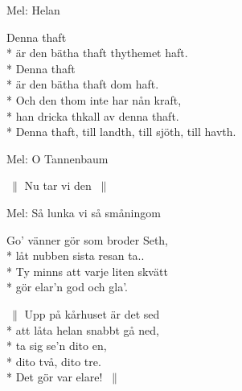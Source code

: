 \begin{SongText}
\begin{SongInfo}
    Mel: Helan
\end{SongInfo}
\begin{SongVerse}
    Denna thaft\\*%
    är den bätha thaft thythemet haft.\\*%
    Denna thaft\\*%
    är den bätha thaft dom haft.\\*%
    Och den thom inte har nån kraft,\\*%
    han dricka thkall av denna thaft.\\*%
    Denna thaft, till landth, till sjöth, till havth.
\end{SongVerse}
\end{SongText}
\begin{SongText}
\begin{SongInfo}
    Mel: O Tannenbaum
\end{SongInfo}
\begin{SongVerse}
    $\:\|$ Nu tar vi den $\:\|$
\end{SongVerse}
\end{SongText}
\begin{SongText}
\begin{SongInfo}
    Mel: Så lunka vi så småningom
\end{SongInfo}
\begin{SongVerse}
    Go’ vänner gör som broder Seth,\\*%
    låt nubben sista resan ta..\\*%
    Ty minns att varje liten skvätt\\*%
    gör elar’n god och gla’.
\end{SongVerse}
\begin{SongVerse}
    $\:\|$ Upp på kårhuset är det sed\\*%
    att låta helan snabbt gå ned,\\*%
    ta sig se’n dito en,\\*%
    dito två, dito tre.\\*%
    Det gör var elare! $\:\|$
\end{SongVerse}
\end{SongText}
